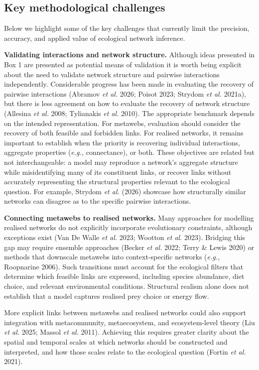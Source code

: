 \documentclass[
]{article}
\begin{document}
\subsection{Key methodological
challenges}\label{key-methodological-challenges}

Below we highlight some of the key challenges that currently limit the
precision, accuracy, and applied value of ecological network inference.

\textbf{Validating interactions and network structure.} Although ideas
presented in Box 1 are presented as potential means of validation it is
worth being explicit about the need to validate network structure and
pairwise interactions independently. Considerable progress has been made
in evaluating the recovery of pairwise interactions (Abramov \emph{et
al.} 2026; Poisot 2023; Strydom \emph{et al.} 2021a), but there is less
agreement on how to evaluate the recovery of network structure (Allesina
\emph{et al.} 2008; Tylianakis \emph{et al.} 2010). The appropriate
benchmark depends on the intended representation. For metawebs,
evaluation should consider the recovery of both feasible and forbidden
links. For realised networks, it remains important to establish when the
priority is recovering individual interactions, aggregate properties
(\emph{e.g.,} connectance), or both. These objectives are related but
not interchangeable: a model may reproduce a network's aggregate
structure while misidentifying many of its constituent links, or recover
links without accurately representing the structural properties relevant
to the ecological question. For example, Strydom \emph{et al.} (2026)
showcase how structurally similar networks can disagree as to the
specific pairwise interactions.

\textbf{Connecting metawebs to realised networks.} Many approaches for
modelling realised networks do not explicitly incorporate evolutionary
constraints, although exceptions exist (Van De Walle \emph{et al.} 2023;
Wootton \emph{et al.} 2023). Bridging this gap may require ensemble
approaches (Becker \emph{et al.} 2022; Terry \& Lewis 2020) or methods
that downscale metawebs into context-specific networks (\emph{e.g.,}
Roopnarine 2006). Such transitions must account for the ecological
filters that determine which feasible links are expressed, including
species abundance, diet choice, and relevant environmental conditions.
Structural realism alone does not establish that a model captures
realised prey choice or energy flow.

More explicit links between metawebs and realised networks could also
support integration with metacommunity, metaecosystem, and
ecosystem-level theory (Liu \emph{et al.} 2025; Massol \emph{et al.}
2011). Achieving this requires greater clarity about the spatial and
temporal scales at which networks should be constructed and interpreted,
and how those scales relate to the ecological question (Fortin \emph{et
al.} 2021).
\end{document}
